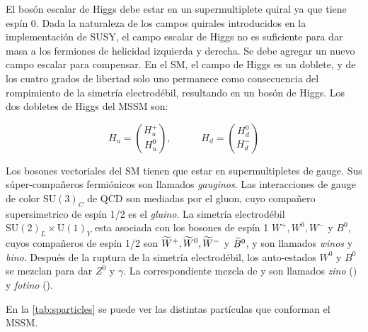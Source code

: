 El bosón escalar de Higgs debe estar en un supermultiplete quiral ya que tiene
espín 0. Dada la naturaleza de los campos quirales introducidos en la
implementación de SUSY, el campo escalar de Higgs no es suficiente para dar masa
a los fermiones de helicidad izquierda y derecha. Se debe agregar un nuevo campo
escalar para compensar. En el SM, el campo de Higgs es un doblete, y de los
cuatro grados de libertad solo uno permanece como consecuencia del rompimiento
de la simetría electrodébil, resultando en un bosón de Higgs. Los dos dobletes
de Higgs del MSSM son:

\begin{equation}
  H_u = \binom{H_u^+}{H_u^0}, \quad \quad \quad H_d = \binom{H_d^0}{H_d^-}
\end{equation}

Los bosones vectoriales del SM tienen que estar en supermultipletes de gauge.
Sus súper-compañeros fermiónicos son llamados \emph{gauginos}. Las interacciones
de gauge de color $\text{SU}(3)_C$ de QCD son mediadas por el gluon, cuyo
compañero supersimetrico de espín 1/2 es el \emph{gluino}. La simetría
electrodébil $\text{SU}(2)_L \times \text{U}(1)_Y$ esta asociada con los bosones
de espín 1 $W^+, W^0, W^-$ y $B^0$, cuyos compañeros de espín 1/2 son $\widetilde{W}^+,
\widetilde{W}^0, \widetilde{W}^-$ y $\widetilde{B}^0$, y son llamados \emph{winos} y
\emph{bino}. Después de la ruptura de la simetría electrodébil, los auto-estados
$W^0$ y $B^0$ se mezclan para dar $Z^0$ y $\gamma$. La correspondiente mezcla de
     {\winozero} y {\bino} son llamados \emph{zino} (\zino) y \emph{fotino}
     (\photino).

En la \cref{tab:sparticles} se puede ver las distintas partículas que
conforman el MSSM.

